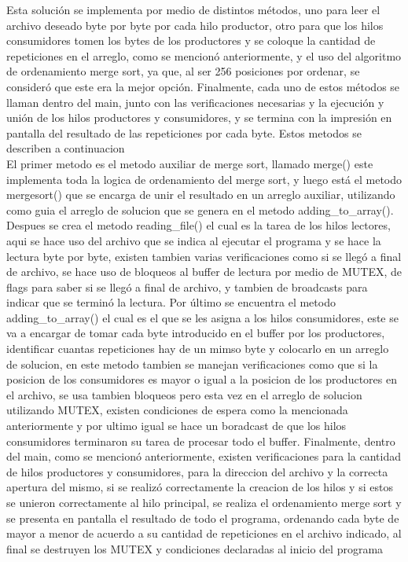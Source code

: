 \documentclass[12pt, article, natbib]{IEEEtran}
\begin{document}
Esta solución se implementa por medio de distintos métodos, uno para leer el archivo deseado byte por byte por cada hilo productor, otro para que los hilos consumidores tomen los bytes de los productores y se coloque la cantidad de repeticiones en el arreglo, como se mencionó anteriormente, y el uso del algoritmo de ordenamiento merge sort, ya que, al ser 256 posiciones por ordenar, se consideró que este era la mejor opción. Finalmente, cada uno de estos métodos se llaman dentro del main, junto con las verificaciones necesarias y la ejecución y unión de los hilos productores y consumidores, y se termina con la impresión en pantalla del resultado de las repeticiones por cada byte. Estos metodos se describen a continuacion\\

El primer metodo es el metodo auxiliar de merge sort, llamado merge() este implementa toda la logica de ordenamiento del merge sort, y luego está el metodo mergesort() que se encarga de unir el resultado en un arreglo auxiliar, utilizando como guia el arreglo de solucion que se genera en el metodo adding\_to\_array(). Despues se crea el metodo reading\_file() el cual es la tarea de los hilos lectores, aqui se hace uso del archivo que se indica al ejecutar el programa y se hace la lectura byte por byte, existen tambien varias verificaciones como si se llegó a final de archivo, se hace uso de bloqueos al buffer de lectura por medio de MUTEX, de flags para saber si se llegó a final de archivo, y tambien de broadcasts para indicar que se terminó la lectura. Por último se encuentra el metodo adding\_to\_array() el cual es el que se les asigna a los hilos consumidores, este se va a encargar de tomar cada byte introducido en el buffer por los productores, identificar cuantas repeticiones hay de un mimso byte y colocarlo en un arreglo de solucion, en este metodo tambien se manejan verificaciones como que si la posicion de los consumidores es mayor o igual a la posicion de los productores en el archivo, se usa tambien bloqueos pero esta vez en el arreglo de solucion utilizando MUTEX, existen condiciones de espera como la mencionada anteriormente y por ultimo igual se hace un boradcast de que los hilos consumidores terminaron su tarea de procesar todo el buffer. Finalmente, dentro del main, como se mencionó anteriormente, existen verificaciones para la cantidad de hilos productores y consumidores, para la direccion del archivo y la correcta apertura del mismo, si se realizó correctamente la creacion de los hilos y si estos se unieron correctamente al hilo principal, se realiza el ordenamiento merge sort y se presenta en pantalla el resultado de todo el programa, ordenando cada byte de mayor a menor de acuerdo a su cantidad de repeticiones en el archivo indicado, al final se destruyen los MUTEX y condiciones declaradas al inicio del programa\\
\end{document}
